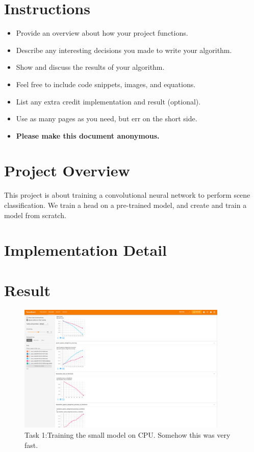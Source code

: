 \section*{Instructions}
\begin{itemize}
  \item Provide an overview about how your project functions. 
  \item Describe any interesting decisions you made to write your algorithm.
  \item Show and discuss the results of your algorithm.
  \item Feel free to include code snippets, images, and equations.
  \item List any extra credit implementation and result (optional).
  \item Use as many pages as you need, but err on the short side.
  \item \textbf{Please make this document anonymous.}
\end{itemize}

\section*{Project Overview}

This project is about training a convolutional neural network to perform scene
classification. We train a head on a pre-trained model, and create and train a
model from scratch.

\section*{Implementation Detail}

\section*{Result}

\begin{figure}[H]
    \includegraphics[width=10cm]{task1v0-2.png}
    \caption{Task 1:Training the small model on CPU. Somehow this was very fast.}
    \label{fig:result1}
\end{figure}

